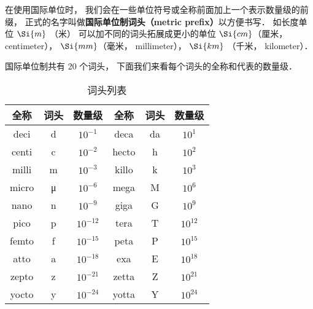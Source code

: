 
\begin{issues}
\issueTODO
\end{issues}


在使用国际单位时， 我们会在一些单位符号或全称前面加上一个表示数量级的前缀， 正式的名字叫做\textbf{国际单位制词头（metric prefix）}以方便书写． 如长度单位 $\Si{m}$ （米） 可以加不同的词头拓展成更小的单位 $\Si{cm}$（厘米， centimeter）， $\Si{mm}$（毫米， millimeter）， $\Si{km}$ （千米， kilometer）．

国际单位制共有 20 个词头， 下面我们来看每个词头的全称和代表的数量级．

\begin{table}[ht]
\centering
\caption{词头列表}\label{UniPre_tab1}
\begin{tabular}{|c|c|c|c|c|c|}
\hline
全称 & 词头 & 数量级 & 全称 & 词头 & 数量级 \\
\hline
deci & d & $10^{-1}$ & deca & da & $10^1$ \\
\hline
centi & c & $10^{-2}$ & hecto & h & $10^2$ \\
\hline
milli & m & $10^{-3}$ & killo & k & $10^3$ \\
\hline
micro & μ & $10^{-6}$ & mega & M & $10^6$ \\
\hline
nano & n & $10^{-9}$ & giga & G & $10^9$ \\
\hline
pico & p & $10^{-12}$ & tera & T & $10^{12}$ \\
\hline
femto & f & $10^{-15}$ & peta & P & $10^{15}$ \\
\hline
atto & a & $10^{-18}$ & exa & E & $10^{18}$ \\
\hline
zepto & z & $10^{-21}$ & zetta & Z & $10^{21}$ \\
\hline
yocto & y & $10^{-24}$ & yotta & Y & $10^{24}$ \\
\hline
\end{tabular}
\end{table}
